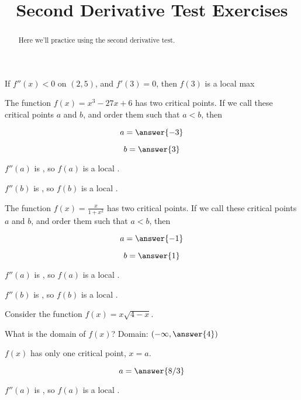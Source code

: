 \documentclass[handout]{ximera}
\title{Second Derivative Test Exercises}
\begin{document}
\begin{abstract}
  Here we'll practice using the second derivative test.
\end{abstract}
\maketitle


\begin{exercise}
If $f''(x)<0$ on $(2,5)$, and $f'(3)=0$, then $f(3)$ is a local max
	\begin{multipleChoice}	
	\end{multipleChoice}
\end{exercise}

\begin{exercise}
The function $f(x) = x^3-27x+6$ has two critical points.  If we call
these critical points $a$ and $b$, and order them such that $a < b$,
then

$$
a = \answer{-3}
$$

$$
b=\answer{3}
$$

$f''(a)$ is , so $f(a)$ is a local .

$f''(b)$ is , so $f(b)$ is a local .
\end{exercise}

\begin{exercise}
The function $f(x) = \displaystyle\frac{x}{1+x^2}$ has two critical points.  If we call
these critical points $a$ and $b$, and order them such that $a < b$,
then

$$
a = \answer{-1}
$$

$$
b=\answer{1}
$$

$f''(a)$ is , so $f(a)$ is a local .

$f''(b)$ is , so $f(b)$ is a local .
\end{exercise}

\begin{exercise}
Consider the function $f(x) = x\sqrt{4-x}$.

What is the domain of $f(x)$?  Domain: $(-\infty,  \answer{4})$

$f(x)$ has only one critical point, $x=a$.

$$
a = \answer{8/3}
$$


$f''(a)$ is , so $f(a)$ is a local .
\end{exercise}
\end{document}
